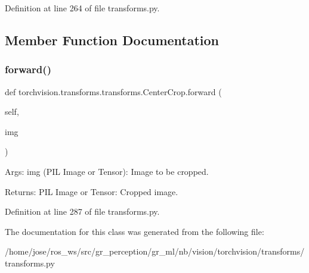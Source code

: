 Definition at line 264 of file transforms.\+py.



\subsection{Member Function Documentation}
\mbox{\label{classtorchvision_1_1transforms_1_1transforms_1_1CenterCrop_a58fccd376624bfd3852a9da8db7c84e6}} 
\subsubsection{\texorpdfstring{forward()}{forward()}}
{\footnotesize\ttfamily def torchvision.\+transforms.\+transforms.\+Center\+Crop.\+forward (\begin{DoxyParamCaption}\item[{}]{self,  }\item[{}]{img }\end{DoxyParamCaption})}

\begin{DoxyVerb}Args:
    img (PIL Image or Tensor): Image to be cropped.

Returns:
    PIL Image or Tensor: Cropped image.
\end{DoxyVerb}
 

Definition at line 287 of file transforms.\+py.



The documentation for this class was generated from the following file\+:\begin{DoxyCompactItemize}
\item 
/home/jose/ros\+\_\+ws/src/gr\+\_\+perception/gr\+\_\+ml/nb/vision/torchvision/transforms/transforms.\+py\end{DoxyCompactItemize}
